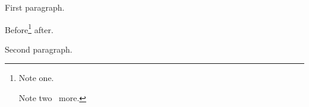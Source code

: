\documentclass{article}
\begin{document}
First paragraph.

Before\footnote{Note one. \par Note two \lxmbf\ more.} after.

Second paragraph.
\end{document}
